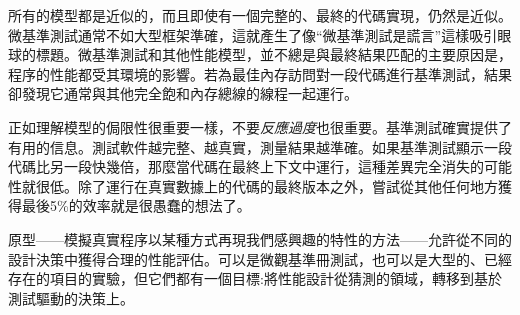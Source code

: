 所有的模型都是近似的，而且即使有一個完整的、最終的代碼實現，仍然是近似。微基準測試通常不如大型框架準確，這就產生了像“微基準測試是謊言”這樣吸引眼球的標題。微基準測試和其他性能模型，並不總是與最終結果匹配的主要原因是，程序的性能都受其環境的影響。若為最佳內存訪問對一段代碼進行基準測試，結果卻發現它通常與其他完全飽和內存總線的線程一起運行。 

正如理解模型的侷限性很重要一樣，不要\textit{反應過度}也很重要。基準測試確實提供了有用的信息。測試軟件越完整、越真實，測量結果越準確。如果基準測試顯示一段代碼比另一段快幾倍，那麼當代碼在最終上下文中運行，這種差異完全消失的可能性就很低。除了運行在真實數據上的代碼的最終版本之外，嘗試從其他任何地方獲得最後5\%的效率就是很愚蠢的想法了。

原型——模擬真實程序以某種方式再現我們感興趣的特性的方法——允許從不同的設計決策中獲得合理的性能評估。可以是微觀基準冊測試，也可以是大型的、已經存在的項目的實驗，但它們都有一個目標:將性能設計從猜測的領域，轉移到基於測試驅動的決策上。 

